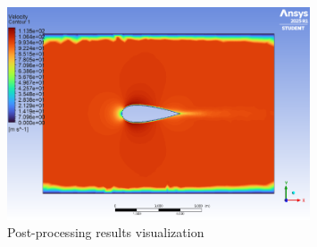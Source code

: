 \documentclass[12pt,a4paper]{article}
\begin{document}
\begin{figure}[H]
    \centering
    \includegraphics[width=0.8\textwidth]{image13.png}
    \caption{Post-processing results visualization}
    \label{fig:sim4}
\end{figure}
\end{document}
